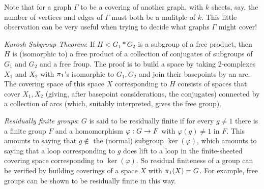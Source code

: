 \msk

Note that for a graph $\Gamma$ to be a covering of another graph, with $k$ sheets, say,
the number of vertices and edges of $\Gamma$ must both be a mulitple of $k$. This
little observation can be very useful when trying to decide what graphs $\Gamma$ might
cover!

\msk

{\it Kurosh Subgroup Theorem}: If $H < G_1*G_2$ is a subgroup of
a free product, then $H$ is (isomorphic to) a free product of a
collection of conjugates of subgroups of $G_1$ and $G_2$ and a 
free froup. The proof is to build a space by taking 2-complexes
$X_1$ and $X_2$ with $\pi_1$'s isomorphic to $G_1,G_2$ and join
their basepoints by an arc. The covering space of this space $X$
corresponding to $H$ consists of spaces that cover $X_1,X_2$
(giving, after basepoint considerations, the conjugates)
connected by a collection of arcs (which, suitably interpreted,
gives the free group).

\msk

{\it Residually finite groups}: $G$ is said to be residually finite if for every $g\neq 1$ there is a 
finite group $F$ and a homomorphism $\varphi: G\rightarrow F$ with $\varphi(g)\neq 1$ in $F$. This 
amounts to saying that $g\notin$ the (normal) subgroup $\ker(\varphi)$, which amounts to
saying that a loop corresponding to $g$ does  lift to a loop in the finite-sheeted
covering space corresponding to $\ker(\varphi)$. So residual finiteness of a group can be
verified by building coverings of a space $X$ with $\pi_1(X)=G$. For example, free groups can be
shown to be residually finite in this way. 

\msk

